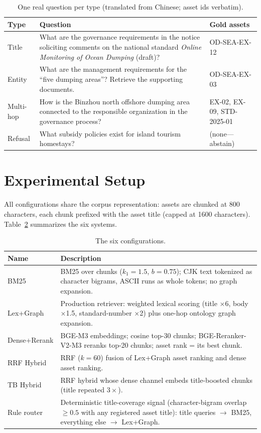 \documentclass[runningheads]{llncs}
\begin{document}
\begin{table}[t]
\caption{One real question per type (translated from Chinese; asset ids
verbatim).}
\label{tab:examples}
\centering
\small
\setlength{\tabcolsep}{3.4pt}
\begin{tabular}{p{1.35cm}p{4.05cm}p{2.0cm}}
\toprule
Type & Question & Gold assets \\
\midrule
Title & What are the governance requirements in the notice soliciting
comments on the national standard \emph{Online Monitoring of Ocean Dumping}
(draft)? & OD-SEA-EX-12 \\
Entity & What are the management requirements for the ``five dumping
areas''? Retrieve the supporting documents. & OD-SEA-EX-03 \\
Multi-hop & How is the Binzhou north offshore dumping area connected to the
responsible organization in the governance process? & EX-02, EX-09,
STD-2025-01 \\
Refusal & What subsidy policies exist for island tourism homestays? &
(none---abstain) \\
\bottomrule
\end{tabular}
\end{table}

\section{Experimental Setup}
\label{sec:configs}

All configurations share the corpus representation: assets are chunked at 800
characters, each chunk prefixed with the asset title (capped at 1600
characters). Table~\ref{tab:configs} summarizes the six systems.

\begin{table}[t]
\caption{The six configurations.}
\label{tab:configs}
\centering
\small
\begin{tabular}{lp{8.2cm}}
\toprule
Name & Description \\
\midrule
BM25 & BM25 over chunks ($k_1{=}1.5$, $b{=}0.75$); CJK text tokenized as
character bigrams, ASCII runs as whole tokens; no graph expansion. \\
Lex+Graph & Production retriever: weighted lexical scoring (title $\times$6,
body $\times$1.5, standard-number $\times$2) plus one-hop ontology graph
expansion. \\
Dense+Rerank & BGE-M3 embeddings; cosine top-30 chunks; BGE-Reranker-V2-M3
reranks top-20 chunks; asset rank = its best chunk. \\
RRF Hybrid & RRF ($k{=}60$) fusion of Lex+Graph asset ranking and dense
asset ranking. \\
TB Hybrid & RRF hybrid whose dense channel embeds title-boosted chunks
(title repeated $3\times$). \\
Rule router & Deterministic title-coverage signal (character-bigram overlap
${\ge}0.5$ with any registered asset title): title queries $\to$ BM25,
everything else $\to$ Lex+Graph. \\
\bottomrule
\end{tabular}
\end{table}
\end{document}

